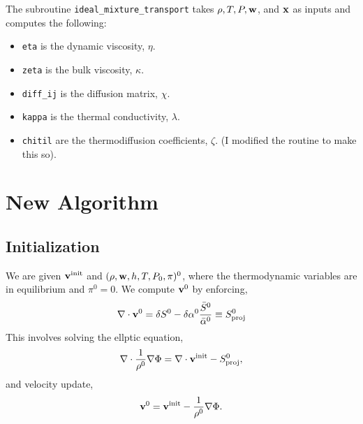 \documentclass[final]{siamltex}
\def\vb {{\bf v}}
\def\wb {{\bf w}}
\def\xb {{\bf x}}
\begin{document}
The subroutine {\tt ideal\_mixture\_transport} takes $\rho,T,P,\wb$, and $\xb$ 
as inputs and computes the following:\\
\begin{itemize}

\item {\tt eta} is the dynamic viscosity, $\eta$.\\

\item {\tt zeta} is the bulk viscosity, $\kappa$.\\

\item {\tt diff\_ij} is the diffusion matrix, $\chi$.\\

\item {\tt kappa} is the thermal conductivity, $\lambda$.\\

\item {\tt chitil} are the thermodiffusion coefficients, $\zeta$.
                   (I modified the routine to make this so).\\

\end{itemize}

\clearpage

\section{New Algorithm}

\subsection{Initialization}
We are given $\vb^{\rm init}$ and $(\rho,\wb,h,T,P_0,\pi)^0$,
where the thermodynamic variables are in equilibrium
and $\pi^0=0$.  We compute $\vb^0$ by enforcing,
\begin{equation}
\nabla\cdot\vb^0 = \delta S^0 - \delta\alpha^0\frac{\bar{S}^0}{\bar{\alpha}^0} \equiv S_{\rm proj}^0
\end{equation}
This involves solving the ellptic equation,
\begin{equation}
\nabla\cdot\frac{1}{\rho^0}\nabla\Phi = \nabla\cdot\vb^{\rm init} - S_{\rm proj}^0,
\end{equation}
and velocity update,
\begin{equation}
\vb^0 = \vb^{\rm init} - \frac{1}{\rho^0}\nabla\Phi.
\end{equation}
\end{document}
